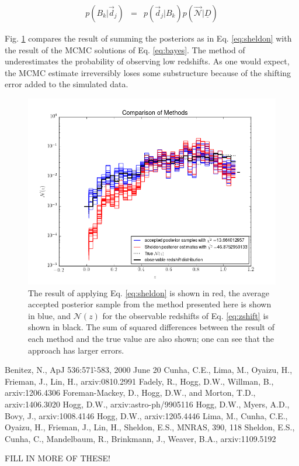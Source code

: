 \documentclass[12pt, onecolumn]{emulateapj}
\newcommand{\textul}{\underline}
\begin{document}
\begin{eqnarray}
\label{eq:posts}
p(B_{k}|\vec{d}_{j}) &=& p(\vec{d}_{j}|B_{k})p(\vec{\mathcal{N}}|\textul{D})
\end{eqnarray}

Fig. \ref{fig:sheldon} compares the result of summing the posteriors as in Eq. \ref{eq:sheldon} with the result of the MCMC solutions of Eq. \ref{eq:bayes}.  The method of \citet{she11} underestimates the probability of observing low redshifts.  As one would expect, the MCMC estimate irreversibly loses some substructure because of the shifting error added to the simulated data.

\begin{figure}
\label{fig:sheldon}
\includegraphics[scale=0.5]{compare-sheldon.png}
\caption{The result of applying Eq. \ref{eq:sheldon} is shown in red, the average accepted posterior sample from the method presented here is shown in blue, and $\mathcal{N}(z)$ for the observable redshifts of Eq. \ref{eq:zshift} is shown in black.  The sum of squared differences between the result of each method and the true value are also shown; one can see that the \citet{she11} approach has larger errors.}
\end{figure}



\begin{thebibliography}{}
Benitez, N., ApJ 536:571-̀583, 2000 June 20
Cunha, C.E., Lima, M., Oyaizu, H., Frieman, J., Lin, H., arxiv:0810.2991
Fadely, R., Hogg, D.W., Willman, B., arxiv:1206.4306
Foreman-Mackey, D., Hogg, D.W., and Morton, T.D., arxiv:1406.3020
Hogg, D.W., arxiv:astro-ph/9905116
Hogg, D.W., Myers, A.D., Bovy, J., arxiv:1008.4146
Hogg, D.W., arxiv:1205.4446
Lima, M., Cunha, C.E., Oyaizu, H., Frieman, J., Lin, H., Sheldon, E.S., MNRAS, 390, 118
Sheldon, E.S., Cunha, C., Mandelbaum, R., Brinkmann, J., Weaver, B.A., arxiv:1109.5192

FILL IN MORE OF THESE!
\end{thebibliography}
\end{document}
